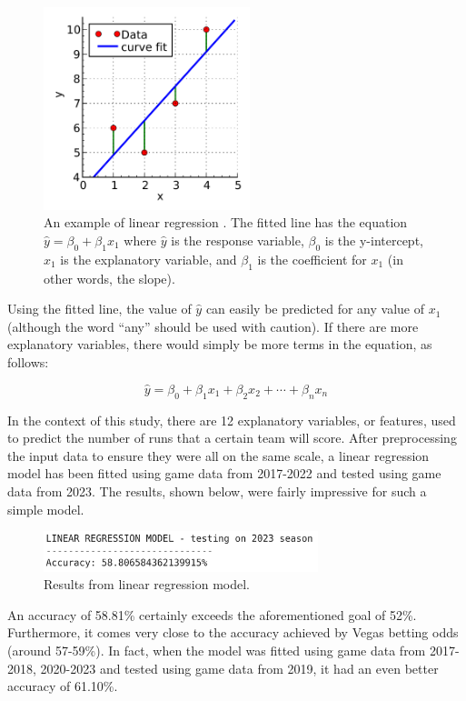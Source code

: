\documentclass{paper}
\begin{document}
\begin{figure}[H]
  \centering
  \includegraphics[width=6cm]{fig12}
  \caption{An example of linear regression \cite{linreg}. The fitted line has the equation $\hat{y}=\beta_0+\beta_1x_1$ where $\hat{y}$ is the response variable, $\beta_0$ is the y-intercept, $x_1$ is the explanatory variable, and $\beta_1$ is the coefficient for $x_1$ (in other words, the slope).}
\end{figure}

Using the fitted line, the value of $\hat{y}$ can easily be predicted for any value of $x_1$ (although the word ``any'' should be used with caution). If there are more explanatory variables, there would simply be more terms in the equation, as follows:

$$\hat{y}=\beta_0+\beta_1x_1+\beta_2x_2+\cdots+\beta_nx_n$$

In the context of this study, there are 12 explanatory variables, or features, used to predict the number of runs that a certain team will score. After preprocessing the input data to ensure they were all on the same scale, a linear regression model has been fitted using game data from 2017-2022 and tested using game data from 2023. The results, shown below, were fairly impressive for such a simple model.

\begin{figure}[H]
  \centering
  \includegraphics[width=8cm]{fig2}
  \caption{Results from linear regression model.}
\end{figure}

An accuracy of 58.81\% certainly exceeds the aforementioned goal of 52\%. Furthermore, it comes very close to the accuracy achieved by Vegas betting odds (around 57-59\%). In fact, when the model was fitted using game data from 2017-2018, 2020-2023 and tested using game data from 2019, it had an even better accuracy of 61.10\%.
\end{document}
